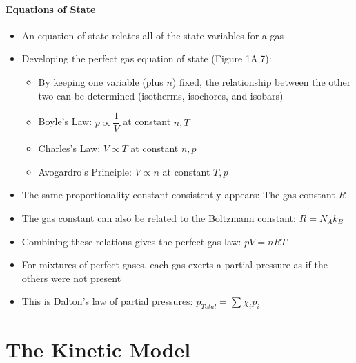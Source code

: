 \documentclass[12pt, openany, letterpaper]{memoir}
\begin{document}
\paragraph{Equations of State}
\begin{itemize}
	\item An equation of state relates all of the state variables for a gas
	\item Developing the perfect gas equation of state (Figure 1A.7):
	      \begin{itemize}
		      \item By keeping one variable (plus $n$) fixed, the relationship between the other two can be determined (isotherms, isochores, and isobars)
		      \item Boyle's Law: $p\propto \dfrac{1}{V}$ at constant $n,T$
		      \item Charles's Law: $V\propto T$ at constant $n,p$
		      \item Avogardro's Principle: $V\propto n$ at constant $T,p$
	      \end{itemize}
	\item The same proportionality constant consistently appears: The gas constant $R$
	\item The gas constant can also be related to the Boltzmann constant: $R=N_A k_B$
	\item Combining these relations gives the perfect gas law: $pV=nRT$
	\item For mixtures of perfect gases, each gas exerts a partial pressure as if the others were not present
	\item This is Dalton's law of partial pressures: ${p_{Total} = \sum{\chi_ip_i}}$

\end{itemize}

\section{The Kinetic Model}
\end{document}
